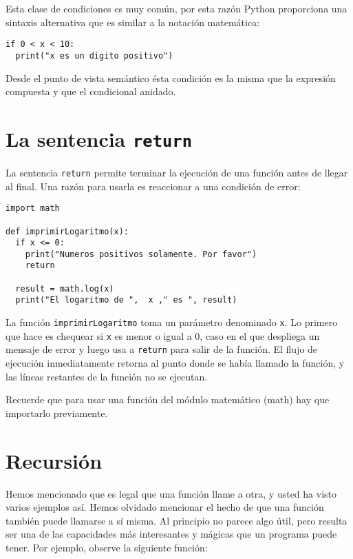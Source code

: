 Esta clase de condiciones es muy común, por esta razón Python proporciona
una sintaxis alternativa que es similar a la notación matemática:
\begin{lstlisting}
if 0 < x < 10:
  print("x es un digito positivo")
\end{lstlisting}

Desde el punto de vista semántico ésta condición es la misma que la
expresión compuesta y que el condicional anidado.

\section{La sentencia \texttt{return} }

 

La sentencia \texttt{return} permite terminar la ejecución de una
función antes de llegar al final. Una razón para usarla es reaccionar
a una condición de error:

\begin{lstlisting}
import math

def imprimirLogaritmo(x):
  if x <= 0:
    print("Numeros positivos solamente. Por favor")
    return

  result = math.log(x)
  print("El logaritmo de ",  x ," es ", result)
\end{lstlisting}
 La función \texttt{imprimirLogaritmo} toma un parámetro denominado
\texttt{x}. Lo primero que hace es chequear si \texttt{x} es menor
o igual a 0, caso en el que despliega un mensaje de error y luego
usa a \texttt{return} para salir de la función. El flujo de ejecución
inmediatamente retorna al punto donde se había llamado la función,
y las líneas restantes de la función no se ejecutan.

Recuerde que para usar una función del módulo matemático (math) hay
que importarlo previamente.

\section{Recursión}

\label{recursion} 

Hemos mencionado que es legal que una función llame a otra, y usted
ha visto varios ejemplos así. Hemos olvidado mencionar el hecho de
que una función también puede llamarse a sí misma. Al principio no
parece algo útil, pero resulta ser una de las capacidades más interesantes
y mágicas que un programa puede tener. Por ejemplo, observe la siguiente
función:

